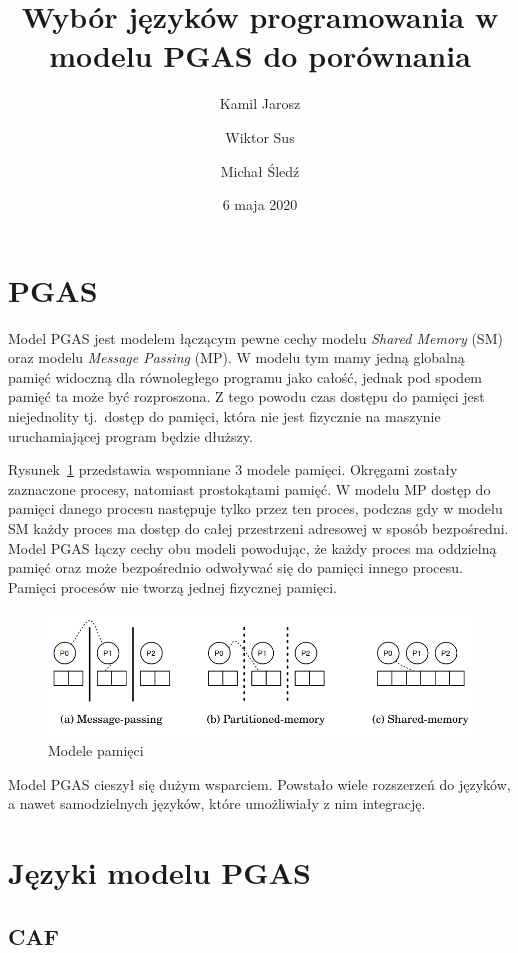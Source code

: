 \documentclass[twocolumn]{article}
\title{Wybór języków programowania w modelu PGAS do porównania}
\author{Kamil Jarosz \and Wiktor Sus \and Michał Śledź}
\date{6 maja 2020}
\begin{document}
\maketitle

\section{PGAS}

Model PGAS jest modelem łączącym pewne cechy modelu \textit{Shared Memory} (SM)
oraz modelu \textit{Message Passing} (MP).
W modelu tym mamy jedną globalną pamięć widoczną dla równoległego programu jako całość, jednak pod spodem
pamięć ta może być rozproszona.
Z tego powodu czas dostępu do pamięci jest niejednolity tj.\ dostęp do pamięci,
która nie jest fizycznie na maszynie uruchamiającej program będzie dłuższy.

Rysunek~\ref{fig:mem_models} przedstawia wspomniane 3 modele pamięci.
Okręgami zostały zaznaczone procesy, natomiast prostokątami pamięć.
W modelu MP dostęp do pamięci danego procesu następuje tylko przez ten proces,
podczas gdy w modelu SM każdy proces ma dostęp
do całej przestrzeni adresowej w sposób bezpośredni.
Model PGAS łączy cechy obu modeli powodując, że każdy proces ma oddzielną pamięć oraz
może bezpośrednio odwoływać się do pamięci innego procesu.
Pamięci procesów nie tworzą jednej fizycznej pamięci.

\begin{figure}[h]
    \centering
    \includegraphics[width=\columnwidth]{mem_models.png}
    \caption{Modele pamięci~\cite{pgas_paper}}
    \label{fig:mem_models}
\end{figure}

Model PGAS cieszył się dużym wsparciem.
Powstało wiele rozszerzeń do języków, a nawet samodzielnych języków,
które umożliwiały z nim integrację.

\section{Języki modelu PGAS}

\subsection{CAF}
\label{ssec:caf}
\end{document}
